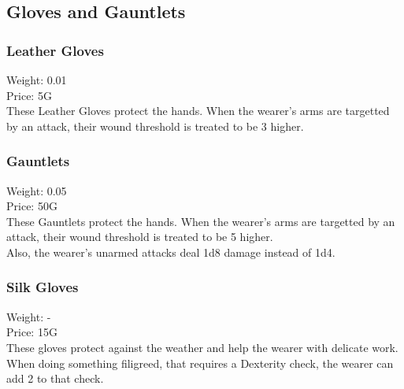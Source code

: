
\subsection{Gloves and Gauntlets}

\subsubsection{Leather Gloves}
Weight: 0.01\\
Price: 5G\\
These Leather Gloves protect the hands. When the wearer's arms are targetted by an attack, their wound threshold is treated to be 3 higher.

\subsubsection{Gauntlets}
Weight: 0.05\\
Price: 50G\\
These Gauntlets protect the hands. When the wearer's arms are targetted by an attack, their wound threshold is treated to be 5 higher.\\
Also, the wearer's unarmed attacks deal 1d8 damage instead of 1d4.

\subsubsection{Silk Gloves}
Weight: -\\
Price: 15G\\
These gloves protect against the weather and help the wearer with delicate work. When doing something filigreed, that requires a Dexterity check, the wearer can add 2 to that check.